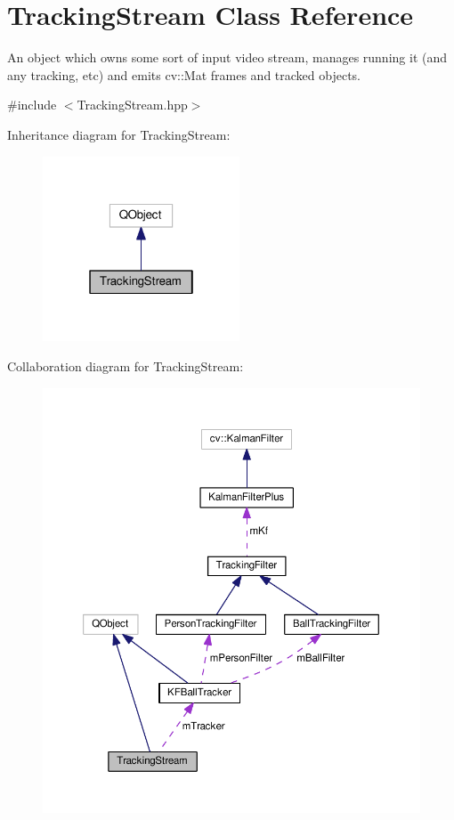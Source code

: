 \hypertarget{classTrackingStream}{}\section{Tracking\+Stream Class Reference}
\label{classTrackingStream}


An object which owns some sort of input video stream, manages running it (and any tracking, etc) and emits cv\+::\+Mat frames and tracked objects.  




{\ttfamily \#include $<$Tracking\+Stream.\+hpp$>$}



Inheritance diagram for Tracking\+Stream\+:\nopagebreak
\begin{figure}[H]
\begin{center}
\leavevmode
\includegraphics[width=166pt]{classTrackingStream__inherit__graph}
\end{center}
\end{figure}


Collaboration diagram for Tracking\+Stream\+:\nopagebreak
\begin{figure}[H]
\begin{center}
\leavevmode
\includegraphics[width=350pt]{classTrackingStream__coll__graph}
\end{center}
\end{figure}
